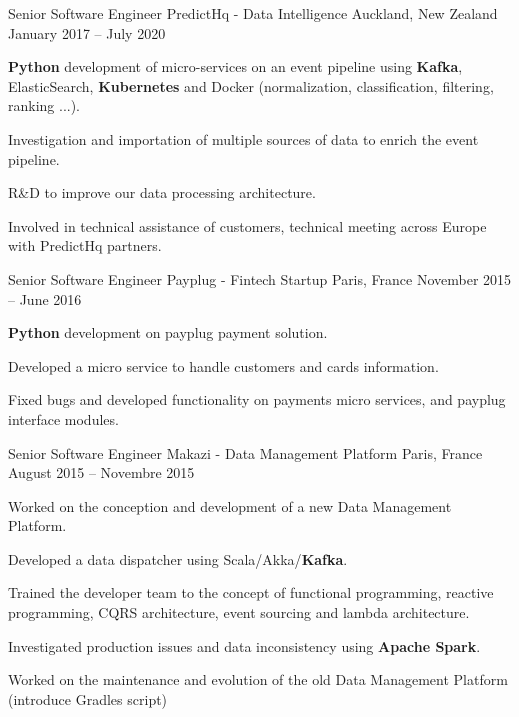 \begin{cventries}
  \cventry
    {Senior Software Engineer} %
    {PredictHq - Data Intelligence} %
    {Auckland, New Zealand} %
    {January 2017 – July 2020} %
    {
      \begin{cvitems} %
        \item {\textbf{Python} development of micro-services on an event pipeline using \textbf{Kafka}, ElasticSearch, \textbf{Kubernetes} and Docker (normalization, classification, filtering, ranking ...).}
        \item {Investigation and importation of multiple sources of data to enrich the event pipeline.}
        \item {R\&D to improve our data processing architecture.}
        \item {Involved in technical assistance of customers, technical meeting across Europe with PredictHq partners.}
      \end{cvitems}
    }

  \cventry
    {Senior Software Engineer} %
    {Payplug - Fintech Startup} %
    {Paris, France} %
    {November 2015 – June 2016} %
    {
      \begin{cvitems} %
        \item {\textbf{Python} development on payplug payment solution.}
        \item {Developed a micro service to handle customers and cards information.}
        \item {Fixed bugs and developed functionality on payments micro services, and payplug interface modules.}
      \end{cvitems}
    }

  \cventry
    {Senior Software Engineer} %
    {Makazi - Data Management Platform} %
    {Paris, France} %
    {August 2015 – Novembre 2015} %
    {
      \begin{cvitems} %
        \item {Worked on the conception and development of a new Data Management Platform.}
        \item {Developed a data dispatcher using Scala/Akka/\textbf{Kafka}.}
        \item {Trained the developer team to the concept of functional programming, reactive programming, CQRS architecture, event sourcing and lambda architecture.}
        \item {Investigated production issues and data inconsistency using \textbf{Apache Spark}.}
        \item {Worked on the maintenance and evolution of the old Data Management Platform (introduce Gradles script)}
      \end{cvitems}
    }


\end{cventries}
